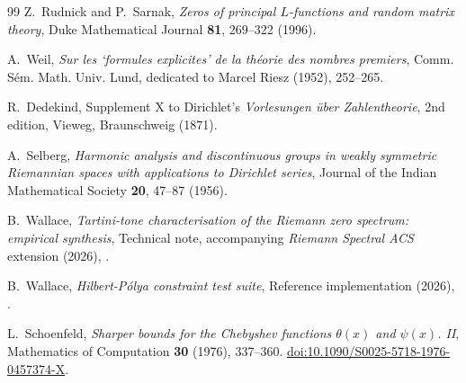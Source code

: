 \documentclass[11pt,a4paper]{article}
\theoremstyle{plain}
\theoremstyle{definition}
\theoremstyle{remark}
\begin{document}
\begin{thebibliography}{99}
Z.~Rudnick and P.~Sarnak,
\textit{Zeros of principal $L$-functions and random matrix theory},
Duke Mathematical Journal \textbf{81}, 269--322 (1996).

A.~Weil,
\textit{Sur les `formules explicites' de la th\'{e}orie des nombres premiers},
Comm. S\'{e}m. Math. Univ. Lund, dedicated to Marcel Riesz (1952), 252--265.

R.~Dedekind,
Supplement X to Dirichlet's \textit{Vorlesungen \"{u}ber Zahlentheorie},
2nd edition, Vieweg, Braunschweig (1871).

A.~Selberg,
\textit{Harmonic analysis and discontinuous groups in weakly symmetric
Riemannian spaces with applications to Dirichlet series},
Journal of the Indian Mathematical Society \textbf{20}, 47--87 (1956).

B.~Wallace,
\textit{Tartini-tone characterisation of the Riemann zero spectrum:
empirical synthesis},
Technical note, accompanying \textit{Riemann Spectral ACS} extension (2026),
.

B.~Wallace,
\textit{Hilbert-P\'{o}lya constraint test suite},
Reference implementation  (2026),
.

L.~Schoenfeld,
\textit{Sharper bounds for the Chebyshev functions $\theta(x)$ and $\psi(x)$. II},
Mathematics of Computation \textbf{30} (1976), 337--360.
\href{https://doi.org/10.1090/S0025-5718-1976-0457374-X}{doi:10.1090/S0025-5718-1976-0457374-X}.

\end{thebibliography}
\end{document}

